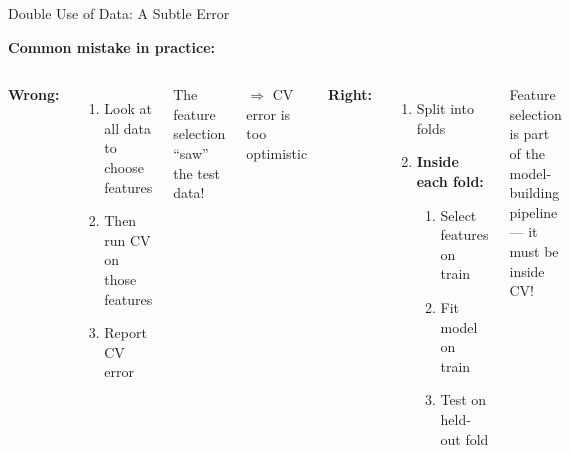 \documentclass[aspectratio=169, 11pt]{beamer}
\begin{document}
\begin{frame}{Double Use of Data: A Subtle Error}

\textbf{Common mistake in practice:}

\begin{columns}
\textbf{\textcolor{softred}{Wrong:}}

\begin{enumerate}
  \item Look at all data to choose features
  \item Then run CV on those features
  \item Report CV error
\end{enumerate}

\vspace{0.3em}
The feature selection ``saw'' the test data!

$\Rightarrow$ CV error is too optimistic

\textbf{\textcolor{softgreen}{Right:}}

\begin{enumerate}
  \item Split into folds
  \item \textbf{Inside each fold:}
  \begin{enumerate}
    \item Select features on train
    \item Fit model on train
    \item Test on held-out fold
  \end{enumerate}
\end{enumerate}

\vspace{0.3em}
Feature selection is part of the model-building pipeline --- it must be inside CV!
\end{columns}

\vspace{0.3em}
\centering
{}
\end{frame}
\end{document}
